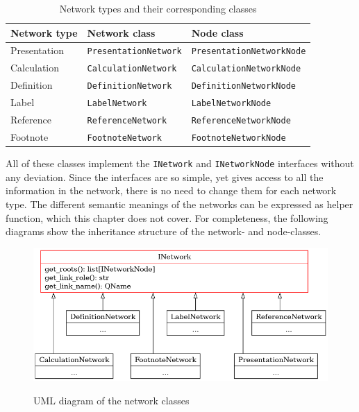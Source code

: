\begin{table}[H]
    \centering
    \caption{Network types and their corresponding classes}
    \begin{tabular}{|l|l|l|}
        \hline
        \textbf{Network type} & \textbf{Network class} & \textbf{Node class} \\ \hline
        Presentation          & \texttt{PresentationNetwork}          & \texttt{PresentationNetworkNode}          \\ \hline
        Calculation           & \texttt{CalculationNetwork}           & \texttt{CalculationNetworkNode}           \\ \hline
        Definition            & \texttt{DefinitionNetwork}            & \texttt{DefinitionNetworkNode}            \\ \hline
        Label                 & \texttt{LabelNetwork}                 & \texttt{LabelNetworkNode}                 \\ \hline
        Reference             & \texttt{ReferenceNetwork}             & \texttt{ReferenceNetworkNode}             \\ \hline
        Footnote              & \texttt{FootnoteNetwork}              & \texttt{FootnoteNetworkNode}              \\ \hline
    \end{tabular}
    \label{tab:network_types}
\end{table}

All of these classes implement the \texttt{INetwork} and \texttt{INetworkNode} interfaces without any deviation.
Since the interfaces are so simple, yet gives access to all the information in the network,
there is no need to change them for each network type.
The different semantic meanings of the networks can be expressed as helper function, which this chapter does not cover.
For completeness, the following diagrams show the inheritance structure of the network- and node-classes.

\begin{figure}[H]
    \centering
    \caption{UML diagram of the network classes}
    \includegraphics[width=\textwidth]{images/brel_network_classes.png}
    \label{fig:brel_network_classes}
\end{figure}

